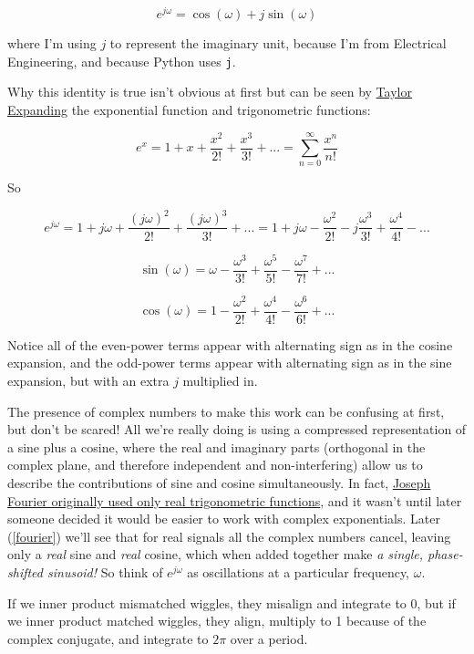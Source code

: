 \documentclass[10pt]{article}
\begin{document}
\begin{equation}\label{euler}
e^{j \omega} = \cos(\omega) + j \sin(\omega)
\end{equation}

where I'm using $j$ to represent the imaginary unit, because I'm from Electrical Engineering, and because Python uses \texttt{j}.\newline

Why this identity is true isn't obvious at first but can be seen by \href{https://math.stackexchange.com/a/492165/278341}{Taylor Expanding}\cite{taylor} the exponential function and trigonometric functions:

$$e^x = 1 + x + \frac{x^2}{2!} + \frac{x^3}{3!} + ... = \sum_{n=0}^{\infty} \frac{x^n}{n!}$$

So

$$ e^{j \omega} = 1 + j \omega + \frac{(j \omega)^2}{2!} + \frac{(j \omega)^3}{3!} + ... = 1 + j \omega - \frac{\omega^2}{2!} - j \frac{\omega^3}{3!} + \frac{\omega^4}{4!} - ... $$

$$ \sin(\omega) = \omega - \frac{\omega^3}{3!} + \frac{\omega^5}{5!} - \frac{\omega^7}{7!} + ... $$

$$ \cos(\omega) = 1 - \frac{\omega^2}{2!} + \frac{\omega^4}{4!} - \frac{\omega^6}{6!} + ... $$

Notice all of the even-power terms appear with alternating sign as in the cosine expansion, and the odd-power terms appear with alternating sign as in the sine expansion, but with an extra $j$ multiplied in.

The presence of complex numbers to make this work can be confusing at first, but don't be scared! All we're really doing is using a compressed representation of a sine plus a cosine, where the real and imaginary parts (orthogonal in the complex plane, and therefore independent and non-interfering) allow us to describe the contributions of sine and cosine simultaneously. In fact, \href{https://math.stackexchange.com/a/1293127/278341}{Joseph Fourier originally used only real trigonometric functions}\cite{complex}, and it wasn't until later someone decided it would be easier to work with complex exponentials. Later (\autoref{fourier}) we'll see that for real signals all the complex numbers cancel, leaving only a \textit{real} sine and \textit{real} cosine, which when added together make \textit{a single, phase-shifted sinusoid!} So think of $e^{j \omega}$ as oscillations at a particular frequency, $\omega$.

If we inner product mismatched wiggles, they misalign and integrate to 0, but if we inner product matched wiggles, they align, multiply to 1 because of the complex conjugate, and integrate to $2\pi$ over a period.
\end{document}
